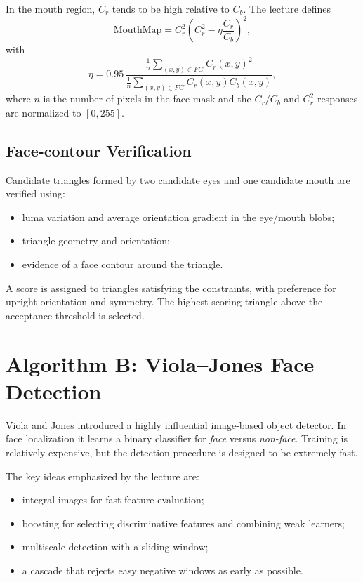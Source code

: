 \documentclass[11pt,a4paper,oneside]{report}
\begin{document}
In the mouth region, $C_r$ tends to be high relative to $C_b$.  The lecture
defines
\[
\mathrm{MouthMap}=C_r^2\left(C_r^2-\eta\frac{C_r}{C_b}\right)^2,
\]
with
\[
\eta=0.95\,
\frac{\frac{1}{n}\sum_{(x,y)\in FG}C_r(x,y)^2}
     {\frac{1}{n}\sum_{(x,y)\in FG}C_r(x,y)C_b(x,y)},
\]
where $n$ is the number of pixels in the face mask and the $C_r/C_b$ and
$C_r^2$ responses are normalized to $[0,255]$.

\subsection{Face-contour Verification}

Candidate triangles formed by two candidate eyes and one candidate mouth are
verified using:
\begin{itemize}
    \item luma variation and average orientation gradient in the eye/mouth
          blobs;
    \item triangle geometry and orientation;
    \item evidence of a face contour around the triangle.
\end{itemize}
A score is assigned to triangles satisfying the constraints, with preference for
upright orientation and symmetry.  The highest-scoring triangle above the
acceptance threshold is selected.

\section{Algorithm B: Viola--Jones Face Detection}
\label{sec:viola-jones}

Viola and Jones introduced a highly influential image-based object detector.  In
face localization it learns a binary classifier for \emph{face} versus
\emph{non-face}.  Training is relatively expensive, but the detection procedure
is designed to be extremely fast.

The key ideas emphasized by the lecture are:
\begin{itemize}
    \item integral images for fast feature evaluation;
    \item boosting for selecting discriminative features and combining weak
          learners;
    \item multiscale detection with a sliding window;
    \item a cascade that rejects easy negative windows as early as possible.
\end{itemize}
\end{document}
